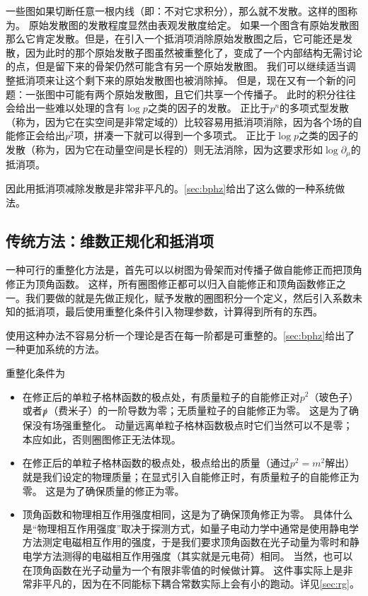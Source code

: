 一些图如果切断任意一根内线（即：不对它求积分），那么就不发散。这样的图称为。
原始发散图的发散程度显然由表观发散度给定。
如果一个图含有原始发散图那么它肯定发散。但是，在引入一个抵消项消除原始发散图之后，它可能还是发散，因为此时的那个原始发散子图虽然被重整化了，变成了一个内部结构无需讨论的点，但是留下来的骨架仍然可能含有另一个原始发散图。
我们可以继续适当调整抵消项来让这个剩下来的原始发散图也被消除掉。
但是，现在又有一个新的问题：一张图中可能有两个原始发散图，且它们共享一个传播子。
此时的积分往往会给出一些难以处理的含有$\log p$之类的因子的发散。
正比于$p^n$的多项式型发散（称为，因为它在实空间是非常定域的）比较容易用抵消项消除，因为各个场的自能修正会给出$p^2$项，拼凑一下就可以得到一个多项式。
正比于$\log p$之类的因子的发散（称为，因为它在动量空间是长程的）则无法消除，因为这要求形如$\log \partial_\mu$的抵消项。

因此用抵消项减除发散是非常非平凡的。\autoref{sec:bphz}给出了这么做的一种系统做法。

\subsection{传统方法：维数正规化和抵消项}

一种可行的重整化方法是，首先可以以树图为骨架而对传播子做自能修正而把顶角修正为顶角函数。
这样，所有圈图修正都可以归入自能修正和顶角函数修正之一。我们要做的就是先做正规化，赋予发散的圈图积分一个定义，然后引入系数未知的抵消项，最后使用重整化条件引入物理参数，计算得到所有的东西。

使用这种办法不容易分析一个理论是否在每一阶都是可重整的。\autoref{sec:bphz}给出了一种更加系统的方法。

重整化条件为
\begin{itemize}
    \item 在修正后的单粒子格林函数的极点处，有质量粒子的自能修正对$p^2$（玻色子）或者$\slashed{p}$（费米子）的一阶导数为零；无质量粒子的自能修正为零。
    这是为了确保没有场强重整化。
    动量远离单粒子格林函数极点时它们当然可以不是零；本应如此，否则圈图修正无法体现。
    \item 在修正后的单粒子格林函数的极点处，极点给出的质量（通过$p^2=m^2$解出）就是我们设定的物理质量；在显式引入自能修正时，有质量粒子的自能修正为零。
    这是为了确保质量的修正为零。
    \item 顶角函数和物理相互作用强度相同，这是为了确保顶角修正为零。
    具体什么是“物理相互作用强度”取决于探测方式，如量子电动力学中通常是使用静电学方法测定电磁相互作用的强度，于是我们要求顶角函数在光子动量为零时和静电学方法测得的电磁相互作用强度（其实就是元电荷）相同。
    当然，也可以在顶角函数在光子动量为一个有限非零值的时候做计算。
    这件事实际上是非常非平凡的，因为在不同能标下耦合常数实际上会有小的跑动。详见\autoref{sec:rg}。
\end{itemize}

